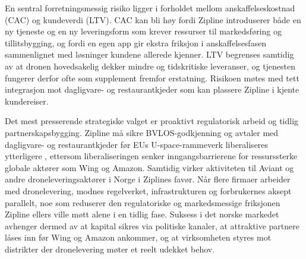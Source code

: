 En sentral forretningsmessig risiko ligger i forholdet mellom
anskaffelseskostnad (CAC) og kundeverdi (LTV). CAC kan bli høy fordi Zipline
introduserer både en ny tjeneste og en ny leveringsform som krever ressurser
til markedsføring og tillitsbygging, og fordi en egen app gir ekstra friksjon
i anskaffelsesfasen sammenlignet med løsninger kundene allerede kjenner. LTV
begrenses samtidig av at dronen hovedsakelig dekker mindre og
tidskritiske leveranser, og tjenesten fungerer derfor ofte som supplement
fremfor erstatning. Risikoen møtes med tett integrasjon mot dagligvare- og
restaurantkjeder som kan plassere Zipline i kjente kundereiser.

Det mest presserende strategiske valget er proaktivt regulatorisk arbeid og
tidlig partnerskapsbygging. Zipline må sikre BVLOS-godkjenning og avtaler med
dagligvare- og restaurantkjeder før EUs U-space-rammeverk liberaliseres
ytterligere \parencite{euuas2021}, ettersom liberaliseringen senker
inngangsbarrierene for ressurssterke globale aktører som Wing og Amazon.
Samtidig virker aktiviteten til Aviant og andre droneleveringsaktører i Norge
i Ziplines favør. Når flere firmaer arbeider med dronelevering, modnes
regelverket, infrastrukturen og forbrukernes aksept parallelt, noe som
reduserer den regulatoriske og markedsmessige friksjonen Zipline ellers
ville møtt alene i en tidlig fase. Suksess i det norske markedet avhenger
dermed av at kapital sikres via politiske kanaler, at attraktive partnere
låses inn før Wing og Amazon ankommer, og at virksomheten styres mot
distrikter der dronelevering møter et reelt udekket behov.
